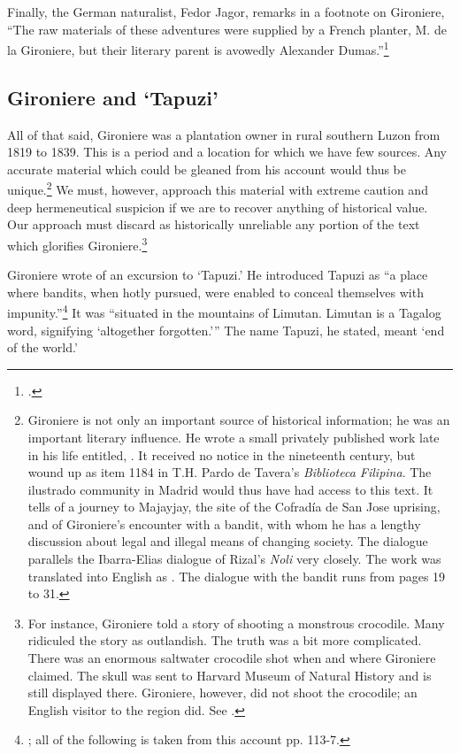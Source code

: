 Finally, the German naturalist, Fedor Jagor, remarks in a footnote on Gironiere, \enquote{The raw materials of these adventures were supplied by a French planter, M. de la Gironiere, but their literary parent is avowedly Alexander Dumas.}\footcite[29; The original German work, \textit{Reisen in den Philippinen}, was published in 1873. No translator is cited for the 1875 English edition]{Jagor1875}

\subsection{Gironiere and \enquote*{Tapuzi}}

All of that said, Gironiere was a plantation owner in rural southern Luzon from 1819 to 1839. This is a period and a location for which we have few sources. Any accurate material which could be gleaned from his account would thus be unique.\footnote{Gironiere is not only an important source of historical information; he was an important literary influence. He wrote a small privately published work late in his life entitled, \cite{Gironiere1862}. It received no notice in the nineteenth century, but wound up as item 1184 in T.H. Pardo de Tavera's \textit{Biblioteca Filipina}. The ilustrado community in Madrid would thus have had access to this text. It tells of a journey to Majayjay, the site of the Cofrad\'ia de San Jose uprising, and of Gironiere's encounter with a bandit, with whom he has a lengthy discussion about legal and illegal means of changing society. The dialogue parallels the Ibarra-Elias dialogue of Rizal's \textit{Noli} very closely. The work was translated into English as \cite{Gironiere1983}. The dialogue with the bandit runs from pages 19 to 31.} We must, however, approach this material with extreme caution and deep hermeneutical suspicion if we are to recover anything of historical value. Our approach must discard as historically unreliable any portion of the text which glorifies Gironiere.\footnote{For instance, Gironiere told a story of shooting a monstrous crocodile. Many ridiculed the story as outlandish. The truth was a bit more complicated. There was an enormous saltwater crocodile shot when and where Gironiere claimed. The skull was sent to Harvard Museum of Natural History and is still displayed there. Gironiere, however, did not shoot the crocodile; an English visitor to the region did. See \cite{Barbour1924}.}

Gironiere wrote of an excursion to \enquote*{Tapuzi.} He introduced Tapuzi as \enquote{a place where bandits, when hotly pursued, were enabled to conceal themselves with impunity.}\footnote{\cite[113]{Gironiere1962}; all of the following is taken from this account pp. 113-7.} It was \enquote{situated in the mountains of Limutan. Limutan is a Tagalog word, signifying \enquote{altogether forgotten.}} The name Tapuzi, he stated, meant \enquote*{end of the world.}

